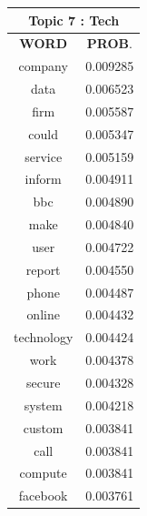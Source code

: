 \begin{table}[h!]
\begin{tabular}{|c c|}
\end{tabular}
\hfill
\begin{tabular}{|c c|} 
\hline
\multicolumn{2}{|c|}{\textbf{Topic 7 : Tech}} \\
\hline
 \textbf{WORD} & \textbf{PROB}.  \\ [0.3ex] 
 \hline
 company &  0.009285 \\
	data  &   0.006523 \\
	firm   &  0.005587 \\
	could   &  0.005347 \\
	service  &   0.005159 \\
	inform  &   0.004911 \\
	bbc   &  0.004890 \\
	make   &  0.004840 \\
	user   &  0.004722 \\
	report  &   0.004550 \\
	phone  &   0.004487 \\
	online   &  0.004432 \\
	technology  &   0.004424 \\
	work   &  0.004378 \\
	secure  &   0.004328 \\
	system  &   0.004218 \\
	custom  &   0.003841 \\
	call  &   0.003841 \\
	compute  &   0.003841 \\
	facebook   &  0.003761 \\ [1ex] 
 \hline
 

\end{tabular}
\end{table}
